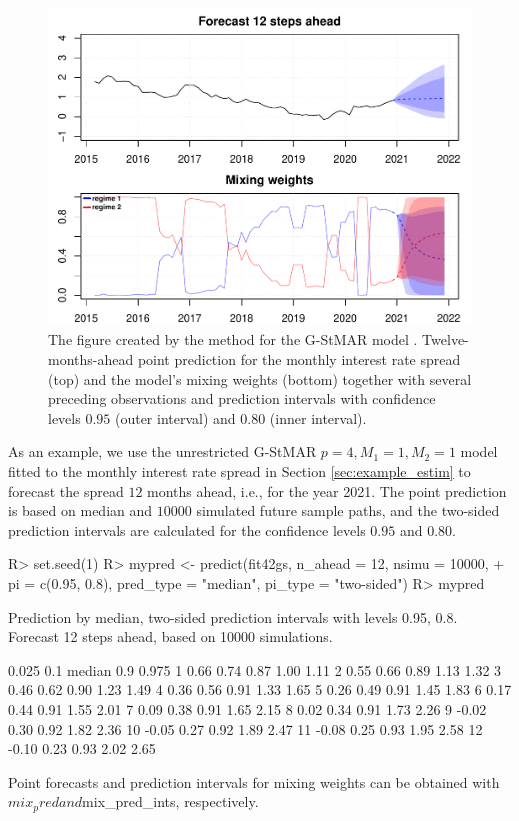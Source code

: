 \documentclass[nojss]{jss} %
\begin{document}
\begin{figure}[t]
  \centering
  \includegraphics{figures/predictfit42gs.pdf}
  \caption{The figure created by the  method for the G-StMAR model . Twelve-months-ahead point prediction for the monthly interest rate spread (top) and the model's mixing weights (bottom) together with several preceding observations and prediction intervals with confidence levels $0.95$ (outer interval) and $0.80$ (inner interval).}
\label{fig:predictfit42gs}
\end{figure}

As an example, we use the unrestricted G-StMAR $p=4, M_1=1, M_2=1$ model fitted to the monthly interest rate spread in Section \ref{sec:example_estim} to forecast the spread $12$ months ahead, i.e., for the year 2021. The point prediction is based on median and $10000$ simulated future sample paths, and the two-sided prediction intervals are calculated for the confidence levels $0.95$ and $0.80$.
%
\begin{CodeChunk}
\begin{CodeInput}
R> set.seed(1)
R> mypred <- predict(fit42gs, n_ahead = 12, nsimu = 10000,
+    pi = c(0.95, 0.8), pred_type = "median", pi_type = "two-sided")
R> mypred
\end{CodeInput}
\begin{CodeOutput}
Prediction by median, two-sided prediction intervals with levels 0.95, 0.8.
Forecast 12 steps ahead, based on 10000 simulations.

   0.025  0.1 median  0.9 0.975
1   0.66 0.74   0.87 1.00  1.11
2   0.55 0.66   0.89 1.13  1.32
3   0.46 0.62   0.90 1.23  1.49
4   0.36 0.56   0.91 1.33  1.65
5   0.26 0.49   0.91 1.45  1.83
6   0.17 0.44   0.91 1.55  2.01
7   0.09 0.38   0.91 1.65  2.15
8   0.02 0.34   0.91 1.73  2.26
9  -0.02 0.30   0.92 1.82  2.36
10 -0.05 0.27   0.92 1.89  2.47
11 -0.08 0.25   0.93 1.95  2.58
12 -0.10 0.23   0.93 2.02  2.65

Point forecasts and prediction intervals for mixing weights can be obtained
with $mix_pred and $mix_pred_ints, respectively.
\end{CodeOutput}
\end{CodeChunk}
\end{document}
